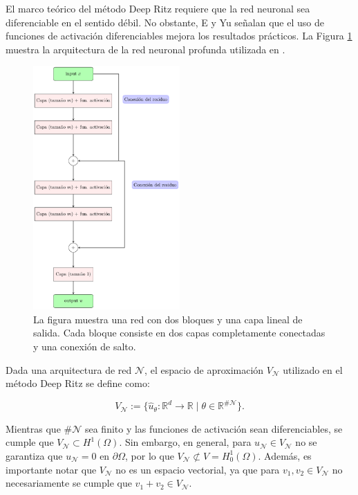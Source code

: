 \documentclass[a4paper,11pt,spanish, twoside, leqno]{tfg-uam}
\theoremstyle{definition}
\begin{document}
El marco teórico del método Deep Ritz requiere que la red neuronal sea diferenciable en el sentido débil. No obstante, E y Yu señalan que el uso de funciones de activación diferenciables mejora los resultados prácticos. La Figura \ref{fig:net_structure_1} muestra la arquitectura de la red neuronal profunda utilizada en \cite{e2017deepritzmethoddeep}.

\begin{figure}[h!]
    \centering
    \vspace{2pt}
    \includegraphics[width=0.5\textwidth]{TEX_Figures/deep_ritz_nn.pdf}
    \caption{La figura muestra una red con dos bloques y una capa lineal de salida.
    Cada bloque consiste en dos capas completamente conectadas y una conexión de salto.}
    \label{fig:net_structure_1}
\end{figure}
Dada una arquitectura de red $ \mathcal{N} $, el espacio de aproximación $ V_{\mathcal{N}} $ utilizado en el método Deep Ritz se define como:

\begin{equation*}
V_{\mathcal{N}} := \{ \hat{u}_\theta: \mathbb{R}^d \to \mathbb{R} \mid \theta \in \mathbb{R}^{\#\mathcal{N}} \}.
\end{equation*}

Mientras que $ \#\mathcal{N} $ sea finito y las funciones de activación sean diferenciables, se cumple que $ V_{\mathcal{N}} \subset H^1(\Omega) $. Sin embargo, en general, para $ u_{\mathcal{N}} \in V_{\mathcal{N}} $ no se garantiza que $ u_{\mathcal{N}} = 0 $ en $ \partial \Omega $, por lo que $ V_{\mathcal{N}} \not\subset V = H^1_0(\Omega) $. Además, es importante notar que $ V_{\mathcal{N}} $ no es un espacio vectorial, ya que para $ v_1, v_2 \in V_{\mathcal{N}} $ no necesariamente se cumple que $ v_1 + v_2 \in V_{\mathcal{N}} $.
\end{document}
